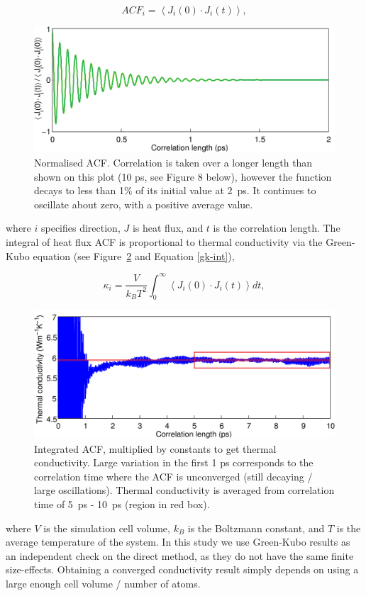 \documentclass[%
preprint,                                  %
nofootinbib,
 amsmath,amssymb,
 aps,
]{revtex4-1}
\begin{document}
\begin{equation}
ACF_i = \left \langle J_i(0) \cdot  J_i(t) \right \rangle,
\label{acf-j}
\end{equation}
\begin{figure}[h]
  \includegraphics[width=\linewidth]{images/gk_acf.png}
  \caption{Normalised ACF. Correlation is taken over a longer length than shown on this plot (10 ps, see Figure 8 below), however the function decays to less than 1\% of its initial value at 2~ps. It continues to oscillate about zero, with a positive average value.}
  \label{fig:gk_acf}
\end{figure}
where $i$ specifies direction, $J$ is heat flux, and $t$ is the correlation length. The integral of heat flux ACF is proportional to thermal conductivity via the Green-Kubo equation (see Figure~\ref{fig:gk_int} and Equation \ref{gk-int}), 

\begin{equation}
\kappa_i = \frac{V}{k_{B}T^2} \int_{0}^{\infty} \left \langle J_i(0) \cdot  J_i(t) \right \rangle dt ,
\label{gk-int}
\end{equation}
\begin{figure}[h]
  \includegraphics[width=\linewidth]{images/gk_int.png}
  \caption{Integrated ACF, multiplied by constants to get thermal conductivity. Large variation in the first 1 ps corresponds to the correlation time where the ACF is unconverged (still decaying / large oscillations). Thermal conductivity is averaged from correlation time of 5~ps - 10~ps (region in red box).}
  \label{fig:gk_int}
\end{figure}
where $V$ is the simulation cell volume, $k_B$ is the Boltzmann constant, and $T$ is the average temperature of the system. In this study we use Green-Kubo results as an independent check on the direct method, as they do not have the same finite size-effects. Obtaining a converged conductivity result simply depends on using a large enough cell volume / number of atoms. 
\end{document}
